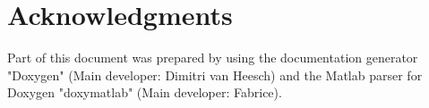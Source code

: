 \chapter*{Acknowledgments}
 Part of this document was prepared by using the documentation generator "Doxygen" (Main developer: Dimitri van Heesch) and the Matlab parser for Doxygen "doxymatlab" (Main developer: Fabrice).

\clearpage
